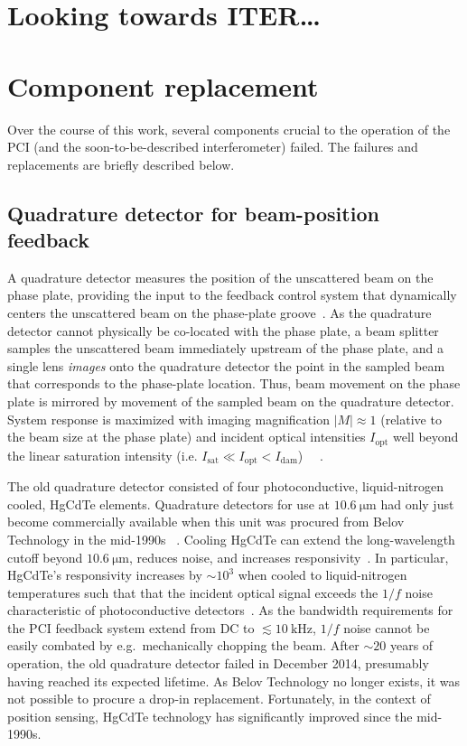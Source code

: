 \section{Looking towards ITER\ldots}


\section{Component replacement}
Over the course of this work,
several components crucial to the operation of the PCI
(and the soon-to-be-described interferometer)
failed.
The failures and replacements are briefly described below.


\subsection{Quadrature detector for beam-position feedback}
A quadrature detector measures the position
of the unscattered beam on the phase plate,
providing the input to the feedback control system
that dynamically centers the unscattered beam
on the phase-plate groove~\cite[Sec.~3.5]{coda_phd}.
As the quadrature detector
cannot physically be co-located with the phase plate,
a beam splitter samples the unscattered beam
immediately upstream of the phase plate, and
a single lens \emph{images} onto the quadrature detector
the point in the sampled beam that corresponds to the phase-plate location.
Thus, beam movement on the phase plate is mirrored
by movement of the sampled beam on the quadrature detector.
System response is maximized
with imaging magnification $|M| \approx 1$
(relative to the beam size at the phase plate) and
incident optical intensities $I_{\text{opt}}$
well beyond the linear saturation intensity
(i.e. $I_{\text{sat}} \ll I_{\text{opt}} < I_{\text{dam}}$)
~\cite{marinoni_FB_detector_report}~\cite[Sec.~3.5(b)]{coda_phd}.

The old quadrature detector consisted of four
photoconductive, liquid-nitrogen cooled, HgCdTe elements.
Quadrature detectors for use at $\SI{10.6}{\micro\meter}$
had only just become commercially available
when this unit was procured from Belov Technology in the mid-1990s
~\cite[Sec.~3.5(b)]{coda_phd}.
Cooling HgCdTe can
extend the long-wavelength cutoff beyond $\SI{10.6}{\micro\meter}$,
reduces noise, and
increases responsivity~\cite{vigo_catalog}.
In particular, HgCdTe's responsivity increases by $\sim 10^3$
when cooled to liquid-nitrogen temperatures such that
that the incident optical signal
exceeds the $1 / f$ noise
characteristic of photoconductive detectors~\cite{vigo_catalog}.
As the bandwidth requirements for the PCI feedback system
extend from DC to $\lesssim \SI{10}{\kilo\hertz}$,
$1 / f$ noise cannot be easily combated by
e.g.\ mechanically chopping the beam.
After $\sim 20$ years of operation,
the old quadrature detector failed in December 2014,
presumably having reached its expected lifetime.
As Belov Technology no longer exists,
it was not possible to procure a drop-in replacement.
Fortunately, in the context of position sensing,
HgCdTe technology has significantly improved since the mid-1990s.

